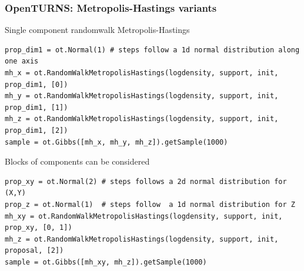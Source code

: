 \documentclass{beamer}
\begin{document}
\begin{frame}[containsverbatim]
\frametitle{OpenTURNS: Metropolis-Hastings variants}
\centering

\begin{block}{Single component randomwalk Metropolis-Hastings}
\medskip
\centering
{}

\begin{lstlisting}
prop_dim1 = ot.Normal(1) # steps follow a 1d normal distribution along one axis
mh_x = ot.RandomWalkMetropolisHastings(logdensity, support, init, prop_dim1, [0])
mh_y = ot.RandomWalkMetropolisHastings(logdensity, support, init, prop_dim1, [1])
mh_z = ot.RandomWalkMetropolisHastings(logdensity, support, init, prop_dim1, [2])
sample = ot.Gibbs([mh_x, mh_y, mh_z]).getSample(1000)
\end{lstlisting}

\end{block}

\begin{block}{Blocks of components can be considered}
\medskip
\centering
{}

\begin{lstlisting}
prop_xy = ot.Normal(2) # steps follows a 2d normal distribution for (X,Y)
prop_z = ot.Normal(1)  # steps follow  a 1d normal distribution for Z
mh_xy = ot.RandomWalkMetropolisHastings(logdensity, support, init, prop_xy, [0, 1])
mh_z = ot.RandomWalkMetropolisHastings(logdensity, support, init, proposal, [2])
sample = ot.Gibbs([mh_xy, mh_z]).getSample(1000)
\end{lstlisting}  

\end{block}
\end{frame}
\end{document}
